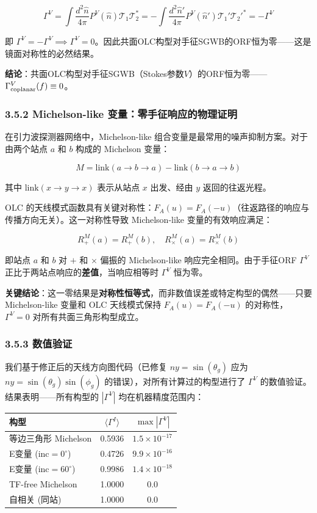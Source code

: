 \documentclass[12pt,a4paper]{article}
\begin{document}
$$\Gamma^V = \int \frac{d^2\hat{n}}{4\pi} P^V(\hat{n}) \mathcal{T}_1\mathcal{T}_2^* = -\int \frac{d^2\hat{n}'}{4\pi} P^V(\hat{n}') \mathcal{T}_1'\mathcal{T}_2'^* = -\Gamma^V$$

即 $\Gamma^V = -\Gamma^V \implies \Gamma^V = 0$。因此共面OLC构型对手征SGWB的ORF恒为零——这是镜面对称性的必然结果。

\textbf{结论}：共面OLC构型对手征SGWB（Stokes参数$V$）的ORF恒为零——$\Gamma^V_{\rm coplanar}(f) \equiv 0$。

\subsubsection{3.5.2 Michelson-like 变量：零手征响应的物理证明}

在引力波探测器网络中，Michelson-like 组合变量是最常用的噪声抑制方案。对于由两个站点 $a$ 和 $b$ 构成的 Michelson 变量：

$$M = \text{link}(a \to b \to a) - \text{link}(b \to a \to b)$$

其中 $\text{link}(x \to y \to x)$ 表示从站点 $x$ 出发、经由 $y$ 返回的往返光程。

OLC 的天线模式函数具有关键对称性：$F_A(u) = F_A(-u)$（往返路径的响应与传播方向无关）。这一对称性导致 Michelson-like 变量的有效响应满足：

$$R_+^M(a) = R_+^M(b), \quad R_\times^M(a) = R_\times^M(b)$$

即站点 $a$ 和 $b$ 对 $+$ 和 $\times$ 偏振的 Michelson-like 响应完全相同。由于手征ORF $\Gamma^V$ 正比于两站点响应的\textbf{差值}，当响应相等时 $\Gamma^V$ 恒为零。

\textbf{关键结论}：这一零结果是\textbf{对称性恒等式}，而非数值误差或特定构型的偶然——只要 Michelson-like 变量和 OLC 天线模式保持 $F_A(u) = F_A(-u)$ 的对称性，$\Gamma^V = 0$ 对所有共面三角形构型成立。

\subsubsection{3.5.3 数值验证}

我们基于修正后的天线方向图代码（已修复 $ny = \sin(\theta_g)$ 应为 $ny = \sin(\theta_g)\sin(\phi_g)$ 的错误），对所有计算过的构型进行了 $\Gamma^V$ 的数值验证。结果表明——所有构型的 $|\Gamma^V|$ 均在机器精度范围内：

\begin{tabular}{|l|c|c|}
\hline
构型 & $\langle\Gamma^I\rangle$ & $\max|\Gamma^V|$ \\
\hline
等边三角形 Michelson & 0.5936 & $1.5 \times 10^{-17}$ \\
E变量 (inc$=0^\circ$) & 0.4726 & $9.9 \times 10^{-16}$ \\
E变量 (inc$=60^\circ$) & 0.9986 & $1.4 \times 10^{-18}$ \\
TF-free Michelson & 1.0000 & $0.0$ \\
自相关 (同站) & 1.0000 & $0.0$ \\
\hline
\end{tabular}
\end{document}
